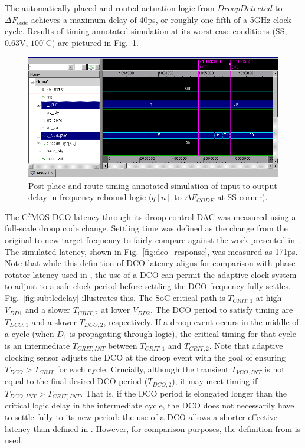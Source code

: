 \documentclass[twoside,9pt,journal,letterpage]{IEEEtran}
\begin{document}
The automatically placed and routed actuation logic from $DroopDetected$ to $\Delta F_{code}$ achieves a maximum delay of 40ps, or roughly one fifth of a 5GHz clock cycle. Results of timing-annotated simulation at its worst-case conditions (SS, 0.63V, $100^{\circ}$C) are pictured in Fig.\ \ref{fig:freqreboundctrl_postpandr_timing}. 

\begin{figure}[!htb]
	\centering
	\includegraphics[width=\columnwidth]{fig_freqreboundctrl_postpandr_timing}
	\caption{Post-place-and-route timing-annotated simulation of input to output delay in frequency rebound logic ($q[n]$ to $\Delta F_{CODE}$ at SS corner).}
	\label{fig:freqreboundctrl_postpandr_timing}
\end{figure}

The C$^2$MOS DCO latency through its droop control DAC was measured using a full-scale droop code change. Settling time was defined as the change from the original to new target frequency to fairly compare against the work presented in \cite{wilcox2015}. The simulated latency, shown in Fig.\ \ref{fig:dco_response}, was measured as 171ps.
Note that while this definition of DCO latency aligns for comparison with phase-rotator latency used in \cite{wilcox2015}, the use of a DCO can permit the adaptive clock system to adjust to a safe clock period before settling the DCO frequency fully settles. Fig.\ \ref{fig:subtledelay} illustrates this. The SoC critical path is $T_{CRIT,1}$ at high $V_{DD1}$ and a slower $T_{CRIT,2}$ at lower $V_{DD2}$. The DCO period to satisfy timing are $T_{DCO,1}$ and a slower $T_{DCO,2}$, respectively. If a droop event occurs in the middle of a cycle (when $D_{1}$ is propagating through logic), the critical timing for that cycle is an intermediate $T_{CRIT,INT}$ between $T_{CRIT,1}$ and $T_{CRIT,2}$. Note that adaptive clocking sensor adjusts the DCO at the droop event with the goal of ensuring $T_{DCO} > T_{CRIT}$ for each cycle. Crucially, although the transient $T_{VCO,INT}$ is not equal to the final desired DCO period ($T_{DCO,2}$), it may meet timing if $T_{DCO,INT} > T_{CRIT,INT}$. That is, if the DCO period is elongated longer than the critical logic delay in the intermediate cycle, the DCO does not necessarily have to settle fully to its new period: the use of a DCO allows a shorter effective latency than defined in \cite{wilcox2015}. However, for comparison purposes, the definition from \cite{wilcox2015} is used.
\end{document}
